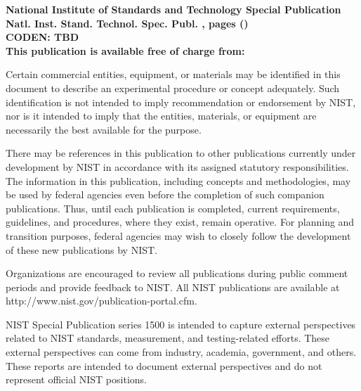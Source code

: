 \begin{titlepage}
\footnotesize  

\begin{flushright}
\normalsize \textbf{National Institute of Standards and Technology Special Publication \pubnumber\\ 
Natl. Inst. Stand. Technol. Spec. Publ. \pubnumber, \pageref{LastPage} pages (\monthyear)} \\
\textbf{CODEN: TBD}\\
\vspace{12pt}
\textbf{This publication is available free of charge from: \DOI}

\end{flushright}


Certain commercial entities, equipment, or materials may be identified in this document to describe an experimental procedure or concept adequately. Such identification is not intended to imply recommendation or endorsement by NIST, nor is it intended to imply that the entities, materials, or equipment are necessarily the best available for the purpose. 

There may be references in this publication to other publications currently under development by NIST in accordance with its assigned statutory responsibilities. The information in this publication, including concepts and methodologies, may be used by federal agencies even before the completion of such companion publications. Thus, until each publication is completed, current requirements, guidelines, and procedures, where they exist, remain operative. For planning and transition purposes, federal agencies may wish to closely follow the development of these new publications by NIST. 

Organizations are encouraged to review all publications during public comment periods and provide feedback to NIST. All NIST publications are available at http://www.nist.gov/publication-portal.cfm.



\vspace{12pt}
\vspace{12pt}
NIST Special Publication series 1500 is intended to capture external perspectives related to NIST standards, measurement, and testing-related efforts. These external perspectives can come from industry, academia, government, and others. These reports are intended to document external perspectives and do not represent official NIST positions.


\end{titlepage}
